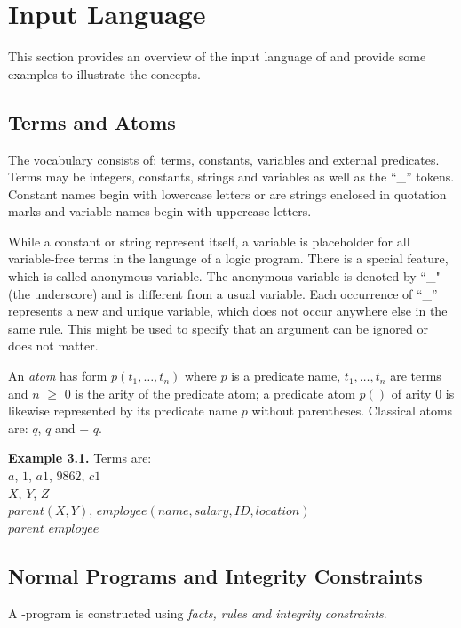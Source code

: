 \documentclass[14pt,a4paper, titlepage]{article}
\begin{document}
\section{Input Language}%
This section provides an overview of the input language of \dlvhex{} and provide some examples to illustrate the concepts. 

\subsection{Terms and Atoms}
The vocabulary consists of: terms, constants, variables and external predicates. Terms may be integers, constants, strings and variables as well as the \enquote{\_} tokens. Constant names begin with lowercase letters or are strings enclosed in quotation marks and variable names begin with uppercase letters.

While a constant or string represent itself, a variable is placeholder for all variable-free terms in the language of a logic program. There is a special feature, which is called anonymous variable. The anonymous variable is denoted by ``\_" (the underscore) and is different from a usual variable. Each occurrence of \enquote{\_} represents a new and unique variable, which does not occur anywhere else in the same rule. This might be used to specify that an argument can be ignored or does not matter.

An \emph{atom} has form $\mathit{p(t_1,\dots,t_n)}$ where $p$ is a predicate name, $t_1,\dots,t_n$ are terms and $n$ $\geq$ $0$ is the arity of the predicate atom; a predicate atom $p()$ of arity 0 is likewise represented by its predicate name $p$ without parentheses. Classical atoms are: $q$, $q$ and $-$ $q$.

\textbf{Example 3.1.} 
Terms are:
\\  $a$, $1$, $\mathit{a1}$, $\mathit{9862}$, $\mathit{c1}$
\\  $X$, $Y$, $Z$
\\  $\mathit{parent}(X,Y)$, $\mathit{employee}(name, salary, ID, location)$
\\  $\mathit{parent}$ $\mathit{employee}$
       
\subsection{Normal Programs and Integrity Constraints}
A \hex{}-program is constructed using \emph{facts, rules and integrity constraints}. 
\end{document}
